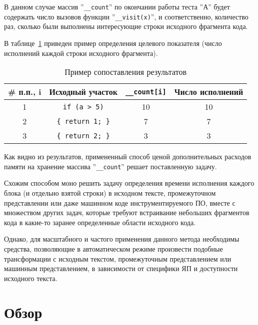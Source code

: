 В данном случае массив ''\lstinline{__count}'' по окончании работы теста ''А'' будет содержать число вызовов функции ''\lstinline{__visit(x)}'', и соответственно, количество раз, сколько были выполнены интересующие строки исходного фрагмента кода.

В таблице~\ref{table:insrtExampleResults} приведен пример определения целевого показателя (число исполнений каждой строки исходного фрагмента).
\begin{table}
  \captionsetup{skip=5pt}
  \caption{Пример сопоставления результатов}
  \label{table:insrtExampleResults}
  \centering
  \begin{tabular}{|c|c|c|c|}
    \hline
    \# п.п., i  & Исходный участок            & \lstinline!__count[i]!  & Число исполнений  \\ \hline
    1           & \lstinline!if (a > 5)!      & 10                      & 10                \\ \hline
    2           & \lstinline!{ return 1; }!   & 7                       & 7                 \\ \hline
    3           & \lstinline!{ return 2; }!   & 3                       & 3                 \\ \hline
  \end{tabular}
\end{table}

Как видно из результатов, примененный способ ценой дополнительных расходов памяти на хранение массива ''\lstinline{__count}'' решает поставленную задачу.

Схожим способом моно решить задачу определения времени исполнения каждого блока (и отдельно взятой строки) в исходном тексте, промежуточном представлении или даже машинном коде инструментируемого ПО, вместе с множеством других задач, которые требуют встраивание небольших фрагментов кода в какие-то заранее определенные области исходного кода.

Однако, для масштабного и частого применения данного метода необходимы средства, позволяющие в автоматическом режиме произвести подобные трансформации с исходным текстом, промежуточным представлением или машинным представлением, в зависимости от специфики ЯП и доступности исходного текста.

\section{Обзор}

